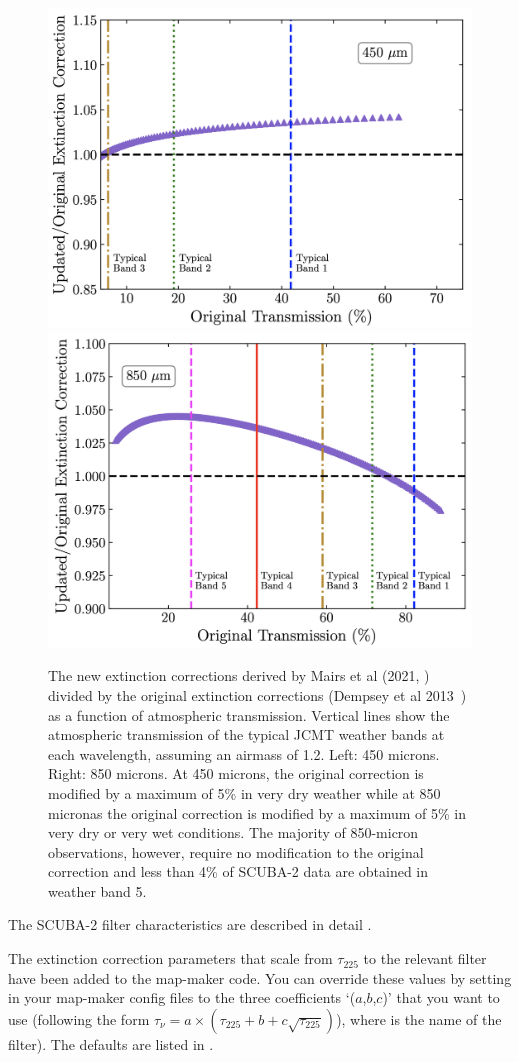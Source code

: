 \begin{figure}
\begin{center}
\includegraphics[width=0.4\linewidth]{sc21-NewExtCor-450} \hspace{0.02\linewidth}
\includegraphics[width=0.4\linewidth]{sc21-NewExtCor-850}
\caption[Updated Extinction Corrections]{The new extinction corrections
derived by Mairs et al (2021, \cite{mairs21}) divided by the original extinction corrections (Dempsey et al 2013~\cite{dempsey12})
as a function of atmospheric transmission. Vertical lines show the atmospheric transmission of the typical JCMT
weather bands at each wavelength, assuming an airmass of 1.2. Left: 450 microns. Right: 850 microns. At 450 microns,
the original correction is modified by a maximum of 5\% in very dry weather while at 850 micronas the original correction is
modified by a maximum of 5\% in very dry or very wet conditions. The
majority of 850-micron observations, however, require no modification
to the original correction and less than 4\% of SCUBA-2 data are obtained in weather band 5. \label{fig:NewExtCor}}
\end{center}
\end{figure}


The SCUBA-2 filter characteristics are described in detail
.

The extinction correction parameters that scale from $\tau_{225}$ to
the relevant filter have been added to the map-maker code. You can
override these values by setting  in
your map-maker config files to the three coefficients `($a$,$b$,$c$)' that
you want to use (following the form $\tau_{\nu} = a \times (\tau_{225} + b + c\sqrt{\tau_{225}})$), where  is the name of the
filter). The defaults are listed in
.



